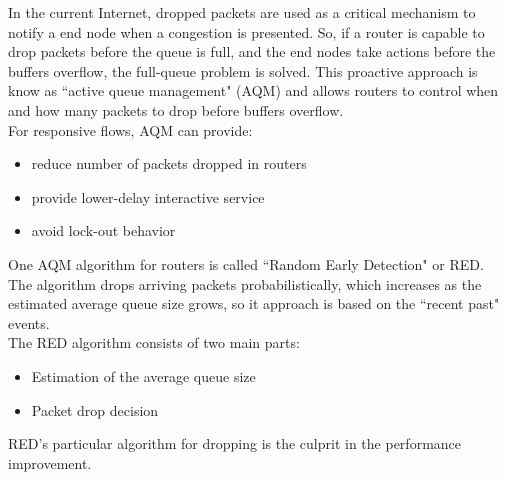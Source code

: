 In the current Internet, dropped packets are used as a critical mechanism to
notify a end node when a congestion is presented. So, if a router is capable to
drop packets before the queue is full, and the end nodes take actions before the
buffers overflow, the full-queue problem is solved. This proactive approach is
know as ``active queue management" (AQM) and allows routers to control when and how
many packets to drop before buffers overflow.\\

For responsive flows, AQM can provide:
\begin{itemize}
\item reduce number of packets dropped in routers
\item provide lower-delay interactive service
\item avoid lock-out behavior
\end{itemize}

One AQM algorithm for routers is called ``Random Early Detection" or RED. The
algorithm drops arriving packets probabilistically, which increases as the
estimated average queue size grows, so it approach is based on the ``recent
past" events.\\

The RED algorithm consists of two main parts:

\begin{itemize}
\item Estimation of the average queue size
\item Packet drop decision
\end{itemize}

RED's particular algorithm for dropping is the culprit in the performance
improvement. 
